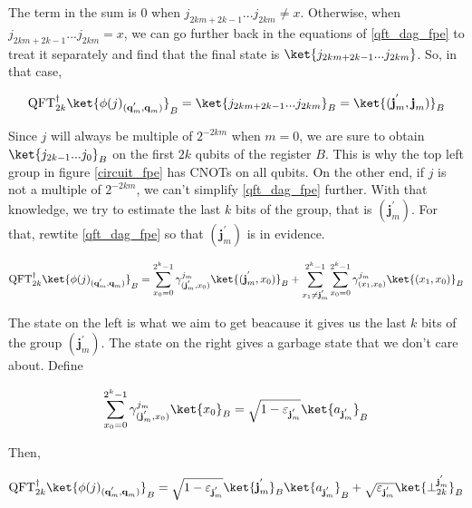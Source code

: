 The term in the sum is 0 when $j_{2km+2k-1}...j_{2km} \neq x$. Otherwise, when $j_{2km+2k-1}...j_{2km} = x$, we can go further back in the equations of \ref{qft_dag_fpe} to treat it separately and find that the final state is $\ket{j_{2km+2k-1}...j_{2km}}$. So, in that case,

\begin{equation*}
    \text{QFT}^{\dagger}_{2k}\ket{\phi(j)_{(\textbf{q}^{'}_m, \textbf{q}_{m})}}_{B} = \ket{j_{2km+2k-1}...j_{2km}}_B = \ket{(\textbf{j}^{'}_m, \textbf{j}_m)}_B
\end{equation*}

Since $j$ will always be multiple of $2^{-2km}$ when $m=0$, we are sure to obtain $\ket{j_{2k-1}...j_0}_B$ on the first $2k$ qubits of the register $B$. This is why the top left group in figure \ref{circuit_fpe} has CNOTs on all qubits. On the other end, if $j$ is not a multiple of $2^{-2km}$, we can't simplify \ref{qft_dag_fpe} further. With that knowledge, we try to estimate the last $k$ bits of the group, that is $(\textbf{j}^{'}_m)$. For that, rewtite \ref{qft_dag_fpe} so that $(\textbf{j}^{'}_m)$ is in evidence.

\begin{equation*}
    \text{QFT}^{\dagger}_{2k}\ket{\phi(j)_{(\textbf{q}^{'}_m, \textbf{q}_{m})}}_{B} = \sum_{x_0 = 0}^{2^k-1}\gamma^{j_m}_{(\textbf{j}^{'}_m, x_0)} \ket{(\textbf{j}^{'}_m, x_0)}_B + \sum_{x_1 \neq \textbf{j}^{'}_m}^{2^k-1}\sum_{x_0=0}^{2^k-1}\gamma^{j_m}_{(x_1,x_0)}\ket{(x_1,x_0)}_B 
\end{equation*}

The state on the left is what we aim to get beacause it gives us the last $k$ bits of the group $(\textbf{j}^{'}_m)$. The state on the right gives a garbage state that we don't care about. Define

\begin{equation*}
    \sum_{x_0=0}^{2^k-1}\gamma_{(\textbf{j}^{'}_m,x_0)}^{j_m}\ket{x_0}_B = \sqrt{1 - \varepsilon_{\textbf{j}^{'}_m}}\ket{a_{\textbf{j}^{'}_m}}_B
\end{equation*}

Then, 

\begin{equation*}
    \text{QFT}^{\dagger}_{2k}\ket{\phi(j)_{(\textbf{q}^{'}_m, \textbf{q}_{m})}}_{B} = \sqrt{1 - \varepsilon_{\textbf{j}^{'}_m}}\ket{\textbf{j}^{'}_m}_B\ket{a_{\textbf{j}^{'}_m}}_B + \sqrt{\varepsilon_{\textbf{j}^{'}_m}}\ket{\perp_{2k}^{\textbf{j}^{'}_m}}_B
\end{equation*}

